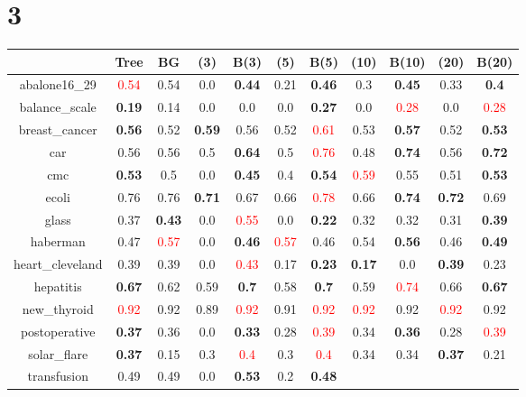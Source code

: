 \documentclass{article}%
\begin{document}
\section*{3}%
\begin{tabular}{c|cccccccccc}%
\hline%
&Tree&BG&(3)&B(3)&(5)&B(5)&(10)&B(10)&(20)&B(20)\\%
\hline%
abalone16\_29&\textcolor{red}{ 
0.54
}&0.54&0.0&\textbf{0.44}&0.21&\textbf{0.46}&0.3&\textbf{0.45}&0.33&\textbf{0.4}\\%
\hline%
balance\_scale&\textbf{0.19}&0.14&0.0&0.0&0.0&\textbf{0.27}&0.0&\textcolor{red}{ 
0.28
}&0.0&\textcolor{red}{ 
0.28
}\\%
\hline%
breast\_cancer&\textbf{0.56}&0.52&\textbf{0.59}&0.56&0.52&\textcolor{red}{ 
0.61
}&0.53&\textbf{0.57}&0.52&\textbf{0.53}\\%
\hline%
car&0.56&0.56&0.5&\textbf{0.64}&0.5&\textcolor{red}{ 
0.76
}&0.48&\textbf{0.74}&0.56&\textbf{0.72}\\%
\hline%
cmc&\textbf{0.53}&0.5&0.0&\textbf{0.45}&0.4&\textbf{0.54}&\textcolor{red}{ 
0.59
}&0.55&0.51&\textbf{0.53}\\%
\hline%
ecoli&0.76&0.76&\textbf{0.71}&0.67&0.66&\textcolor{red}{ 
0.78
}&0.66&\textbf{0.74}&\textbf{0.72}&0.69\\%
\hline%
glass&0.37&\textbf{0.43}&0.0&\textcolor{red}{ 
0.55
}&0.0&\textbf{0.22}&0.32&0.32&0.31&\textbf{0.39}\\%
\hline%
haberman&0.47&\textcolor{red}{ 
0.57
}&0.0&\textbf{0.46}&\textcolor{red}{ 
0.57
}&0.46&0.54&\textbf{0.56}&0.46&\textbf{0.49}\\%
\hline%
heart\_cleveland&0.39&0.39&0.0&\textcolor{red}{ 
0.43
}&0.17&\textbf{0.23}&\textbf{0.17}&0.0&\textbf{0.39}&0.23\\%
\hline%
hepatitis&\textbf{0.67}&0.62&0.59&\textbf{0.7}&0.58&\textbf{0.7}&0.59&\textcolor{red}{ 
0.74
}&0.66&\textbf{0.67}\\%
\hline%
new\_thyroid&\textcolor{red}{ 
0.92
}&0.92&0.89&\textcolor{red}{ 
0.92
}&0.91&\textcolor{red}{ 
0.92
}&\textcolor{red}{ 
0.92
}&0.92&\textcolor{red}{ 
0.92
}&0.92\\%
\hline%
postoperative&\textbf{0.37}&0.36&0.0&\textbf{0.33}&0.28&\textcolor{red}{ 
0.39
}&0.34&\textbf{0.36}&0.28&\textcolor{red}{ 
0.39
}\\%
\hline%
solar\_flare&\textbf{0.37}&0.15&0.3&\textcolor{red}{ 
0.4
}&0.3&\textcolor{red}{ 
0.4
}&0.34&0.34&\textbf{0.37}&0.21\\%
\hline%
transfusion&0.49&0.49&0.0&\textbf{0.53}&0.2&\textbf{0.48}&\textcolor{red}{ 
}
\end{tabular}
\end{document}
